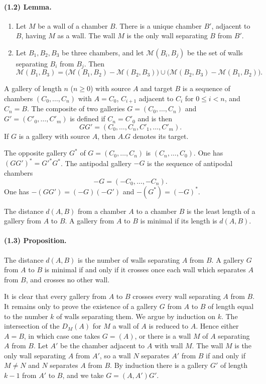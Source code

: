 \documentclass[10pt]{article}
\newcommand{\mcM}{\mathcal M}
\begin{document}
\paragraph{(1.2) Lemma.} \begin{enumerate}[label=(\roman*)]
\item Let $M$ be a wall of a chamber $B$. There is a unique chamber $B'$, adjacent to $B$, having $M$ as a wall. The wall $M$ is the only wall separating $B$ from $B'$.
\item Let $B_1,B_2,B_3$ be three chambers, and let $\mcM(B_i,B_j)$ be the set of walls separating $B_i$ from $B_j$. Then
\[
\mcM(B_1,B_3)=\bigl(\mcM(B_1,B_2)-\mcM(B_2,B_3)\bigr)\cup
\bigl(\mcM(B_2,B_3)-\mcM(B_1,B_2)\bigr).
\]
\end{enumerate}

A gallery of length $n$ ($n\ge0$) with source $A$ and target $B$ is a sequence of chambers $(C_0,\ldots,C_n)$ with $A=C_0$, $C_{i+1}$ adjacent to $C_i$ for $0\le i<n$, and $C_n=B$. The composite of two galleries $G=(C_0,\ldots,C_n)$ and $G'=(C'_0,\ldots,C'_m)$ is defined if $C_n=C'_0$ and is then
\[
GG'=(C_0,\ldots,C_n,C'_1,\ldots,C'_m).
\]
If $G$ is a gallery with source $A$, then $A.G$ denotes its target.

The opposite gallery $G^*$ of $G=(C_0,\ldots,C_n)$ is $(C_n,\ldots,C_0)$. One has $(GG')^*=G'^*G^*$. The antipodal gallery $-G$ is the sequence of antipodal chambers
\[
-G=(-C_0,\ldots,-C_n).
\]
One has $-(GG')=(-G)(-G')$ and $-(G^*)=(-G)^*$.

The distance $d(A,B)$ from a chamber $A$ to a chamber $B$ is the least length of a gallery from $A$ to $B$. A gallery from $A$ to $B$ is minimal if its length is $d(A,B)$.

\paragraph{(1.3) Proposition.} The distance $d(A,B)$ is the number of walls separating $A$ from $B$. A gallery $G$ from $A$ to $B$ is minimal if and only if it crosses once each wall which separates $A$ from $B$, and crosses no other wall.

It is clear that every gallery from $A$ to $B$ crosses every wall separating $A$ from $B$. It remains only to prove the existence of a gallery $G$ from $A$ to $B$ of length equal to the number $k$ of walls separating them. We argue by induction on $k$. The intersection of the $D_M(A)$ for $M$ a wall of $A$ is reduced to $A$. Hence either $A=B$, in which case one takes $G=(A)$, or there is a wall $M$ of $A$ separating $A$ from $B$. Let $A'$ be the chamber adjacent to $A$ with wall $M$. The wall $M$ is the only wall separating $A$ from $A'$, so a wall $N$ separates $A'$ from $B$ if and only if $M\ne N$ and $N$ separates $A$ from $B$. By induction there is a gallery $G'$ of length $k-1$ from $A'$ to $B$, and we take $G=(A,A')G'$.
\end{document}
